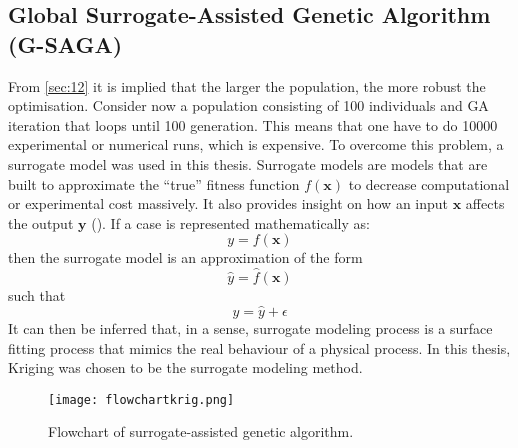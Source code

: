 \subsection{Global Surrogate-Assisted Genetic Algorithm (G-SAGA)}
\label{sec:13}
From \ref{sec:12} it is implied that the larger the population, the more robust the optimisation. Consider now a population consisting of 100 individuals and GA iteration that loops until 100 generation. This means that one have to do 10000 experimental or numerical runs, which is expensive. To overcome this problem, a surrogate model was used in this thesis. Surrogate models are models that are built to approximate the ``true'' fitness function $f(\mathbf{x})$ to decrease computational or experimental cost massively. It also provides insight on how an input $\mathbf{x}$ affects the output $\mathbf{y}$ (\cite{ong}). If a case is represented mathematically as:
\begin{equation}
    y = f(\mathbf{x})
    \label{eq:truefcn}
\end{equation}
then the surrogate model is an approximation of the form
\begin{equation}
    \hat{y} = \hat{f}(\mathbf{x})
    \label{eq:approxfcn}
\end{equation}
such that
\begin{equation}
    y = \hat{y} + \epsilon
    \label{eq:true2approx}
\end{equation}
It can then be inferred that, in a sense, surrogate modeling process is a surface fitting process that mimics the real behaviour of a physical process. In this thesis, Kriging was chosen to be the surrogate modeling method.\par
\begin{figure}[H]
    \centering
    \texttt{[image: flowchartkrig.png]}
    \caption{Flowchart of surrogate-assisted genetic algorithm.}
    \label{fig:flowchartkrig}
\end{figure}
